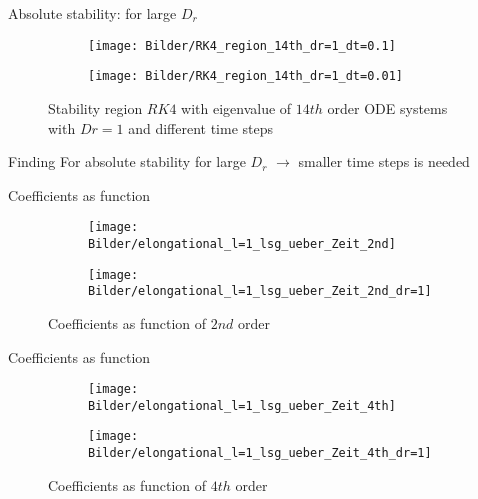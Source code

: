 \begin{frame}{Absolute stability: for large $D_r$}
	\begin{figure}
		\begin{subfigure}{0.48\textwidth}
			\texttt{[image: Bilder/RK4\_region\_14th\_dr=1\_dt=0.1]}
		\end{subfigure}
		\hfill
		\begin{subfigure}{0.48\textwidth}
			\texttt{[image: Bilder/RK4\_region\_14th\_dr=1\_dt=0.01]}
		\end{subfigure}
		\caption{Stability region $RK4$ with eigenvalue of $14th$ order ODE systems with $Dr=1$ and different time steps}
	\end{figure}

	\begin{block}{Finding}
	For absolute stability for large $D_r$  $\rightarrow$ smaller time steps is needed
	\end{block}
\end{frame}


\begin{frame}{Coefficients as function}
	\begin{figure}
		\begin{subfigure}{0.48\textwidth}
			\texttt{[image: Bilder/elongational\_l=1\_lsg\_ueber\_Zeit\_2nd]}
		\end{subfigure}
		\hfill
		\begin{subfigure}{0.48\textwidth}
			\texttt{[image: Bilder/elongational\_l=1\_lsg\_ueber\_Zeit\_2nd\_dr=1]}
		\end{subfigure}
		\caption{Coefficients as function of $2nd$ order}
	\end{figure}
\end{frame}


\begin{frame}{Coefficients as function}
	\begin{figure}
		\begin{subfigure}{0.48\textwidth}
			\texttt{[image: Bilder/elongational\_l=1\_lsg\_ueber\_Zeit\_4th]}
		\end{subfigure}
		\hfill
		\begin{subfigure}{0.48\textwidth}
			\texttt{[image: Bilder/elongational\_l=1\_lsg\_ueber\_Zeit\_4th\_dr=1]}
		\end{subfigure}
		\caption{Coefficients as function of $4th$ order}
	\end{figure}
\end{frame}


